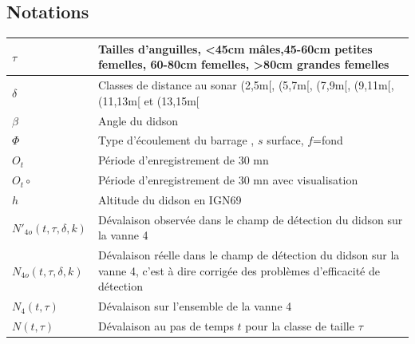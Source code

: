\documentclass[11pt,twocolumn,titlepage,twoside]{article}
\begin{document}
\subsection{Notations}
\begin{table}[htp] \centering 
  \begin{tabular}{|l | p{6cm}|} 
  \hline    
        $\tau$ & Tailles d'anguilles, <45cm mâles,45-60cm petites
       femelles, 60-80cm femelles, >80cm grandes femelles\\ \hline
         $\delta$ & Classes de distance au sonar (2,5m[, (5,7m[, (7,9m[, (9,11m[, (11,13m[ et
        (13,15m[ \\ \hline   
         $\beta$ & Angle du didson\\ \hline
         $\Phi$ & Type d'écoulement du barrage , $s$ surface, $f$=fond\\ \hline
         $O_t$& Période d'enregistrement de 30 mn\\ \hline
         $O_t\circ$& Période d'enregistrement de 30 mn avec
         visualisation\\\hline
         $h$ & Altitude du didson en IGN69 \\ \hline
         $N'_{4o}(t,\tau,\delta,k)$ & Dévalaison observée dans le champ de
           détection du didson sur la vanne 4\\ \hline
         $N_{4o}(t,\tau,\delta,k)$ & Dévalaison réelle dans le champ de
        détection du didson sur la vanne 4, c'est à dire corrigée des problèmes
        d'efficacité de détection\\ \hline      
         $N_4(t,\tau)$ & Dévalaison sur l'ensemble de la vanne 4\\ \hline   
         $N(t,\tau)$ & Dévalaison au pas de temps $t$ pour la
         classe de taille $\tau$\\ \hline
  \end{tabular} 
\end{table} 
\end{document}
